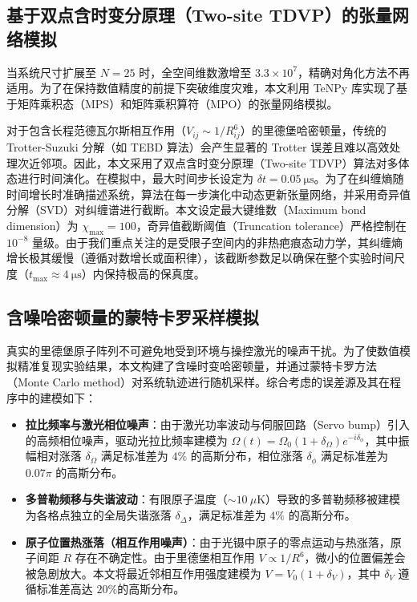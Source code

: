 \documentclass[../main.tex]{subfiles}
\begin{document}
\subsection{基于双点含时变分原理（Two-site TDVP）的张量网络模拟}

当系统尺寸扩展至 $N=25$ 时，全空间维数激增至 $3.3 \times 10^7$，精确对角化方法不再适用。为了在保持数值精度的前提下突破维度灾难，本文利用 TeNPy 库实现了基于矩阵乘积态（MPS）和矩阵乘积算符（MPO）的张量网络模拟。

对于包含长程范德瓦尔斯相互作用（$V_{ij} \sim 1/R_{ij}^6$）的里德堡哈密顿量，传统的 Trotter-Suzuki 分解（如 TEBD 算法）会产生显著的 Trotter 误差且难以高效处理次近邻项。因此，本文采用了双点含时变分原理（Two-site TDVP）算法对多体态进行时间演化。在模拟中，最大时间步长设定为 $\delta t = \SI{0.05}{\us}$。为了在纠缠熵随时间增长时准确描述系统，算法在每一步演化中动态更新张量网络，并采用奇异值分解（SVD）对纠缠谱进行截断。本文设定最大键维数（Maximum bond dimension）为 $\chi_{\max} = 100$，奇异值截断阈值（Truncation tolerance）严格控制在 $10^{-8}$ 量级。由于我们重点关注的是受限子空间内的非热疤痕态动力学，其纠缠熵增长极其缓慢（遵循对数增长或面积律），该截断参数足以确保在整个实验时间尺度（$t_{\max} \approx \SI{4}{\us}$）内保持极高的保真度。

\subsection{含噪哈密顿量的蒙特卡罗采样模拟}

真实的里德堡原子阵列不可避免地受到环境与操控激光的噪声干扰。为了使数值模拟精准复现实验结果，本文构建了含噪时变哈密顿量，并通过蒙特卡罗方法（Monte Carlo method）对系统轨迹进行随机采样。综合考虑的误差源及其在程序中的建模如下：
\begin{itemize}
    \item \textbf{拉比频率与激光相位噪声}：由于激光功率波动与伺服回路（Servo bump）引入的高频相位噪声，驱动光拉比频率建模为 $\Omega(t) = \Omega_0 (1 + \delta_\Omega) e^{-i \delta_\phi}$，其中振幅相对涨落 $\delta_\Omega$ 满足标准差为 $4\%$ 的高斯分布，相位涨落 $\delta_\phi$ 满足标准差为 $0.07\pi$ 的高斯分布。
    \item \textbf{多普勒频移与失谐波动}：有限原子温度（$\sim 10\ \mu\text{K}$）导致的多普勒频移被建模为各格点独立的全局失谐涨落 $\delta_\Delta$，满足标准差为 $4\%$ 的高斯分布。
    \item \textbf{原子位置热涨落（相互作用噪声）}：由于光镊中原子的零点运动与热涨落，原子间距 $R$ 存在不确定性。由于里德堡相互作用 $V \propto 1/R^6$，微小的位置偏差会被急剧放大。本文将最近邻相互作用强度建模为 $V = V_0 (1 + \delta_V)$，其中 $\delta_V$ 遵循标准差高达 $20\%$的高斯分布。
\end{itemize}
\end{document}

